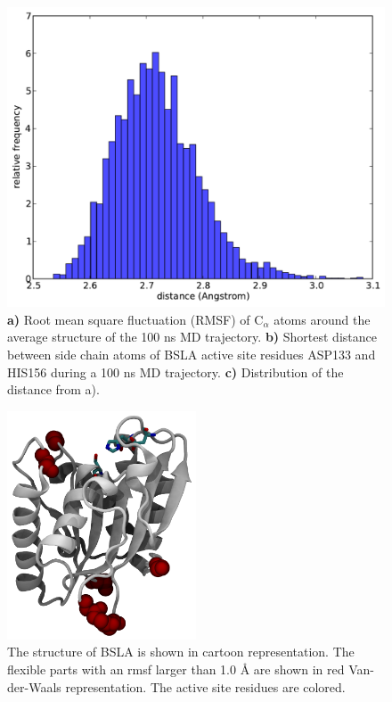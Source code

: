 \documentclass[english, a4paper, 12pt, titlepage, draft]{article}
\begin{document}
\begin{figure}
\begin{minipage}[]{0.45\linewidth}
        \includegraphics[width=\textwidth]{figures/BSLA_solo/BSLA_distribution_ASP133_HIS156.pdf}  
    \end{minipage}
    \caption{
    \textbf{a)} Root mean square fluctuation (RMSF) of C$_\alpha$ atoms around the average structure of the 100 ns MD trajectory.
    \textbf{b)} Shortest distance between side chain atoms of BSLA active site residues ASP133 and HIS156 during a 100 ns MD trajectory. 
    \textbf{c)} Distribution of the distance from a).}
\label{fig:BSLA_solo}
\end{figure} 


\begin{figure}
    \centering
    \includegraphics[width=0.5\textwidth]{figures/BSLA_flexibility.png}
    \caption{The structure of BSLA is shown in cartoon representation. The flexible parts with an rmsf larger than 1.0 \r{A} are shown in red Van-der-Waals representation. The active site residues are colored.}
    \label{fig:BSLA_flexibility}
\end{figure}       
 
\end{document}
